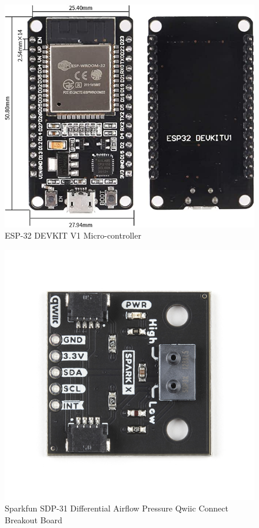 \begin{center}
    \begin{figure}
        \centering
        \includegraphics[scale=0.3]{diagrams/oem/esp-32.jpg}
        \caption{ESP-32 DEVKIT V1 Micro-controller}
        \label{fig:ESP-32}
    \end{figure}
\end{center}

\begin{center}
    \begin{figure}
        \centering
        \includegraphics{diagrams/oem/spd31.jpg}
        \caption{Sparkfun SDP-31 Differential Airflow Pressure Qwiic Connect Breakout Board}
        \label{fig:sdp-31}
    \end{figure}
\end{center}


